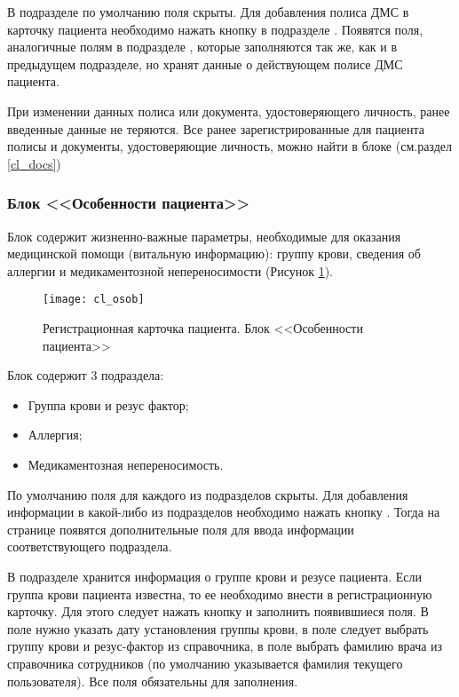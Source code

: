В подразделе  по умолчанию поля скрыты. Для добавления полиса ДМС в карточку пациента необходимо нажать кнопку  в подразделе . Появятся поля, аналогичные полям в подразделе , которые заполняются так же, как и в предыдущем подразделе, но хранят данные о действующем полисе ДМС пациента.

\begin{prim}
При изменении данных полиса или документа, удостоверяющего личность, ранее введенные данные не теряются. Все ранее зарегистрированные для пациента полисы  и документы, удостоверяющие личность, можно найти в блоке  (см.раздел \ref{cl_docs})
\end{prim}

\subsubsection{Блок <<Особенности пациента>>} 

Блок  содержит жизненно-важные параметры, необходимые для оказания медицинской помощи (витальную информацию): группу крови, сведения об аллергии и медикаментозной непереносимости (Рисунок \ref{img_cl_osob}). 

\begin{figure}[!ht]\centering
 \texttt{[image: cl\_osob]}
 \caption{Регистрационная карточка пациента. Блок <<Особенности пациента>>}
 \label{img_cl_osob}
\end{figure} 

Блок содержит 3 подраздела: 
\begin{itemize}
 \item Группа крови и резус фактор;
 \item Аллергия;
 \item Медикаментозная непереносимость.
\end{itemize}

По умолчанию поля для каждого из подразделов скрыты. Для добавления информации в какой-либо из подразделов необходимо нажать кнопку . Тогда на странице появятся дополнительные поля для ввода информации соответствующего подраздела.

В подразделе  хранится информация о группе крови  и резусе пациента. Если группа крови пациента известна, то ее необходимо внести в регистрационную карточку. Для этого следует нажать кнопку  и заполнить появившиеся поля. В поле  нужно указать дату установления группы крови, в поле  следует выбрать группу крови и резус-фактор из справочника, в поле  выбрать фамилию врача из справочника сотрудников (по умолчанию указывается фамилия текущего пользователя). Все поля обязательны для заполнения. 

